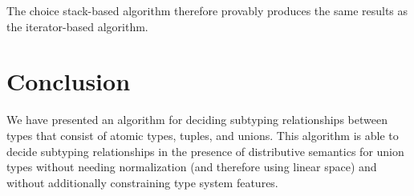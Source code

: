 \documentclass[a4paper,english]{lipics-v2018}
\begin{document}
The choice stack-based algorithm therefore provably produces the same results
as the iterator-based algorithm. 

\section{Conclusion}

We have presented an algorithm for deciding subtyping relationships between
types that consist of atomic types, tuples, and unions. This algorithm is able
to decide subtyping relationships in the presence of distributive semantics
for union types without needing normalization (and therefore using linear
space) and without additionally constraining type system features.

%

\end{document}
